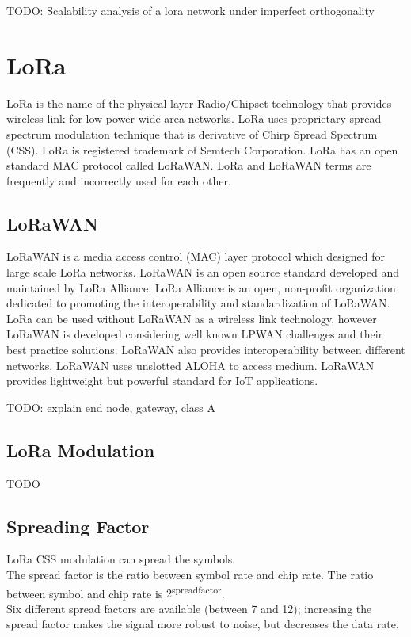 \documentclass[conference]{IEEEtran}
\begin{document}
\par TODO: Scalability analysis of a lora network under imperfect orthogonality \cite{8430542}


\section{LoRa}
\par LoRa is the name of the physical layer Radio/Chipset technology that provides wireless link for low power wide area networks. LoRa uses proprietary spread spectrum modulation technique that is derivative of Chirp Spread Spectrum (CSS). LoRa is registered trademark of Semtech Corporation. LoRa has an open standard MAC protocol called LoRaWAN. LoRa and LoRaWAN terms are frequently and incorrectly used for each other.

\subsection{LoRaWAN}
\par LoRaWAN is a media access control (MAC) layer protocol which designed for large scale LoRa networks. LoRaWAN is an open source standard developed and maintained by LoRa Alliance. LoRa Alliance is an open, non-profit organization dedicated to promoting the interoperability and standardization of LoRaWAN. LoRa can be used without LoRaWAN as a wireless link technology, however LoRaWAN is developed considering well known LPWAN challenges and their best practice solutions. LoRaWAN also provides interoperability between different networks. LoRaWAN uses unslotted ALOHA to access medium. LoRaWAN provides lightweight but powerful standard for IoT applications.

\par TODO: explain end node, gateway, class A

\subsection{LoRa Modulation}
\par TODO

\subsection{Spreading Factor}
\par LoRa CSS modulation can spread the symbols.\\
The spread factor is the ratio between symbol rate and chip rate. The ratio between symbol and chip rate is $2$\textsuperscript{spreadfactor}.\\
Six different spread factors are available (between 7 and 12); increasing the spread factor makes the signal more robust to noise, but decreases the data rate.\\
\end{document}
